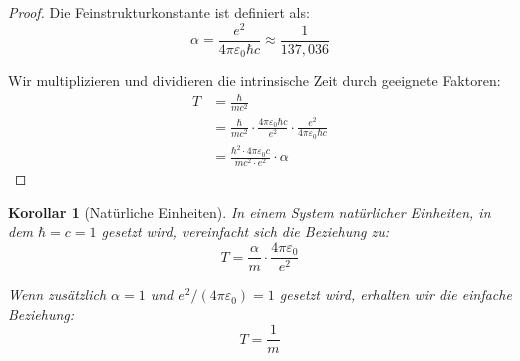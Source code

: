 \documentclass{article}
\newtheorem{corollary}[theorem]{Korollar}
\theoremstyle{definition}
\theoremstyle{remark}
\begin{document}
		\begin{proof}
			Die Feinstrukturkonstante ist definiert als:
			\begin{equation}
				\alpha = \frac{e^2}{4\pi\varepsilon_0\hbar c} \approx \frac{1}{137,036}
			\end{equation}
			
			Wir multiplizieren und dividieren die intrinsische Zeit durch geeignete Faktoren:
			\begin{align}
				T &= \frac{\hbar}{mc^2} \\
				&= \frac{\hbar}{mc^2} \cdot \frac{4\pi\varepsilon_0\hbar c}{e^2} \cdot \frac{e^2}{4\pi\varepsilon_0\hbar c} \\
				&= \frac{\hbar^2 \cdot 4\pi\varepsilon_0 c}{mc^2 \cdot e^2} \cdot \alpha
			\end{align}
		\end{proof}
		
		\begin{corollary}[Natürliche Einheiten]
			In einem System natürlicher Einheiten, in dem $\hbar = c = 1$ gesetzt wird, vereinfacht sich die Beziehung zu:
			\begin{equation}
				T = \frac{\alpha}{m} \cdot \frac{4\pi\varepsilon_0}{e^2}
			\end{equation}
			
			Wenn zusätzlich $\alpha = 1$ und $e^2/(4\pi\varepsilon_0) = 1$ gesetzt wird, erhalten wir die einfache Beziehung:
			\begin{equation}
				T = \frac{1}{m}
			\end{equation}
		\end{corollary}
		
\end{document}
